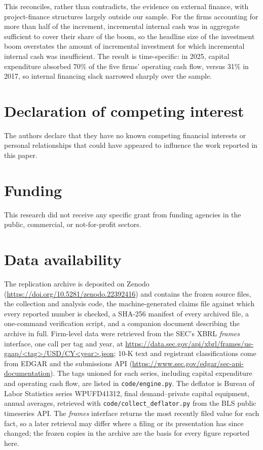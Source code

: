 \documentclass[preprint,11pt]{elsarticle}
\begin{document}
This reconciles, rather than contradicts, the evidence on external finance, with project-finance
structures largely outside our sample. For the firms accounting for more than half of the increment,
incremental internal cash was in aggregate sufficient to cover their share of the boom, so the
headline size of the investment boom overstates the amount of incremental investment for which
incremental internal cash was insufficient. The result is time-specific: in 2025, capital
expenditure absorbed 70\% of the five firms' operating cash flow, versus 31\% in 2017, so internal
financing slack narrowed sharply over the sample.


\section*{Declaration of competing interest}
The authors declare that they have no known competing financial interests or personal
relationships that could have appeared to influence the work reported in this paper.

\section*{Funding}
This research did not receive any specific grant from funding agencies in the public,
commercial, or not-for-profit sectors.

\section*{Data availability}
The replication archive is deposited on Zenodo (\url{https://doi.org/10.5281/zenodo.22392416}) and contains the frozen source
files, the collection and analysis code, the machine-generated claims file against which every
reported number is checked, a SHA-256 manifest of every archived file, a one-command verification
script, and a companion document describing the archive in full.
Firm-level data were retrieved from the SEC's XBRL \emph{frames}
interface, one call per tag and year, at
\url{https://data.sec.gov/api/xbrl/frames/us-gaap/<tag>/USD/CY<year>.json}; 10-K text and
registrant classifications come from EDGAR and the submissions API
(\url{https://www.sec.gov/edgar/sec-api-documentation}). The tags unioned for each series,
including capital expenditure and operating cash flow, are listed in \texttt{code/engine.py}.
The deflator is Bureau of Labor Statistics series WPUFD41312, final demand--private capital
equipment, annual averages, retrieved with \texttt{code/collect\_deflator.py} from the BLS public
timeseries API. The \emph{frames} interface returns the
most recently filed value for each fact, so a later retrieval may differ where a filing or its
presentation has since changed; the frozen copies in the archive are the basis for every figure reported here.
\end{document}
